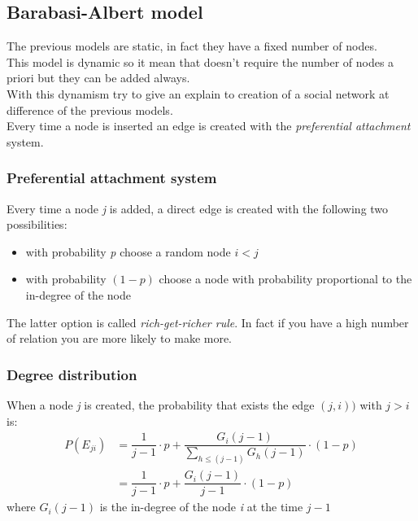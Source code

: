 \subsection{Barabasi-Albert model}
The previous models are static, in fact they have a fixed number of nodes. \\This model is dynamic so it mean that doesn't require the number of nodes a priori but they can be added always.\\ 
With this dynamism try to give an explain to creation of a social network at difference of the previous models.\\
Every time a node is inserted an edge is created with the \textit{preferential attachment} system.
\subsubsection{Preferential attachment system}
Every time a node \textit{j} is added, a direct edge is created with the following two possibilities:
	\begin{itemize}
		\item with probability \textit{p} choose a random node $ i < j $  
		\item with probability $ (1-p) $ choose a node with probability proportional to the in-degree of the node
	\end{itemize}
The latter option is called \textit{rich-get-richer rule}. In fact if you have a  high number of relation you are more likely to make more.
\subsubsection{Degree distribution}
When a node \textit{j} is created, the probability that exists the edge $ (j, i)) $ with $ j > i $ is:
\begin{align*}
P(E_{ji}) &= \dfrac{1}{j-1} \cdot p + \dfrac{G_i(j-1)}{\sum_{h \leq (j-1)} G_h(j-1)} \cdot (1-p) \\
&=  \dfrac{1}{j-1} \cdot p + \dfrac{G_i(j-1)}{j-1} \cdot (1-p) 
\end{align*}
where $ G_i(j-1) $ is the in-degree of the node \textit{i} at the time $ j-1 $
